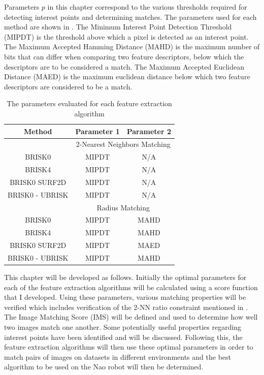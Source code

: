 \documentclass[11pt]{report}
\begin{document}

Parameters $p$ in this chapter correspond to the various thresholds required for detecting interest points and determining matches. The parameters used for each method are shown in . The Minimum Interest Point Detection Threshold (MIPDT) is the threshold above which a pixel is detected as an interest point. The Maximum Accepted Hamming Distance (MAHD) is the maximum number of bits that can differ when comparing two feature descriptors, below which the descriptors are to be considered a match. The Maximum Accepted Euclidean Distance (MAED) is the maximum euclidean distance below which two feature descriptors are considered to be a match.\\

\begin{table}
\centering
\caption{The parameters evaluated for each feature extraction algorithm}
\begin{tabular}{|c|c|c|}
\hline 
Method & Parameter 1 & Parameter 2\tabularnewline
\hline 
 & \multicolumn{2}{c|}{2-Nearest Neighbors Matching}\tabularnewline
\hline 
BRISK0 & MIPDT & N/A\tabularnewline
\hline 
BRISK4 & MIPDT & N/A\tabularnewline
\hline 
BRISK0 SURF2D & MIPDT & N/A\tabularnewline
\hline 
BRISK0 - UBRISK & MIPDT & N/A\tabularnewline
\hline 
 & \multicolumn{2}{c|}{Radius Matching}\tabularnewline
\hline 
BRISK0 & MIPDT & MAHD\tabularnewline
\hline 
BRISK4 & MIPDT & MAHD\tabularnewline
\hline 
BRISK0 SURF2D & MIPDT & MAED\tabularnewline
\hline 
BRISK0 - UBRISK & MIPDT & MAHD\tabularnewline
\hline 
\end{tabular}
\label{tab:parameters}
\end{table}

This chapter will be developed as follows. Initially the optimal parameters for each of the feature extraction algorithms will be calculated using a score function that I developed. Using these parameters, various matching properties will be verified which includes verification of the 2-NN ratio constraint mentioned in . The Image Matching Score (IMS) will be defined and used to determine how well two images match one another. Some potentially useful properties regarding interest points have been identified and will be discussed. Following this, the feature extraction algorithms will then use these optimal parameters in order to match pairs of images on datasets in different environments and the best algorithm to be used on the Nao robot will then be determined.\\   
\end{document}
